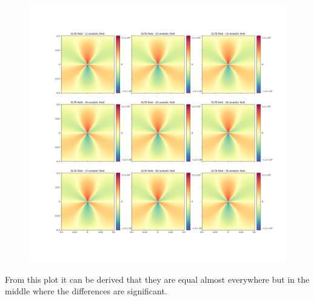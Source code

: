 \documentclass[12pt,a4paper]{article}
\theoremstyle{plain}
\begin{document}
\begin{figure}[H]
	\centering
	\includegraphics[width=.8\textwidth]{../difference_of_analytic_field_and_elte_field.png}
\end{figure}

\par From this plot it can be derived that they are equal almost everywhere but in the middle where
the differences are significant.
\end{document}

